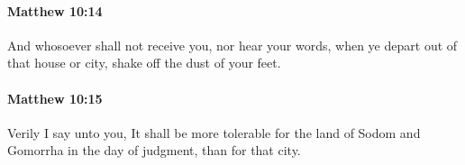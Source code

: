 		\paragraph{Matthew 10:14} %
			\label{MATTHEW-10-14}

			And whosoever shall not receive you, nor hear your words, when ye depart out of that house or city, shake off the dust of your feet.

			\begin{framed}
			\scriptsize
				\begin{compactdesc}
					\item[SBLG] 
				\end{compactdesc}
			\end{framed}

		\paragraph{Matthew 10:15} %
			\label{MATTHEW-10-15}

			Verily I say unto you, It shall be more tolerable for the land of Sodom and Gomorrha in the day of judgment, than for that city.


